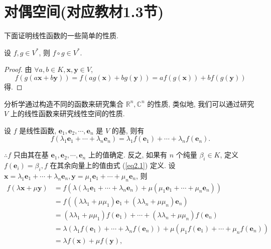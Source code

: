 \documentclass{ctexart}
\begin{document}
\section{对偶空间(对应教材1.3节)}
下面证明线性函数的一些简单的性质.
\begin{property}\label{p2.1}
    设 $f,g\in V^*$, 则 $f\circ g\in V^*$.
\end{property}
\begin{proof}
    由 $\forall a,b\in K,\boldsymbol{x},\boldsymbol{y}\in V$,
    \[f(g(a\boldsymbol{x}+b\boldsymbol{y}))=f(ag(\boldsymbol{x})+bg(\boldsymbol{y}))=af(g(\boldsymbol{x}))+bf(g(\boldsymbol{y}))\]
    得.
\end{proof}

分析学通过构造不同的函数来研究集合 $\mathbb{R}^n,\mathbb{C}^n$ 的性质, 类似地, 我们可以通过研究 $V$ 上的线性函数来研究线性空间的性质.

设 $f$ 是线性函数, $\boldsymbol{e}_1,\boldsymbol{e}_2,\cdots,\boldsymbol{e}_n$ 是 $V$ 的基, 则有
\begin{equation}\label{eq2.1}
    f(\lambda_1\boldsymbol{e}_1+\cdots+\lambda_n\boldsymbol{e}_n)=\lambda_1f(\boldsymbol{e}_1)+\cdots+\lambda_nf(\boldsymbol{e}_n).
\end{equation}

$\therefore f$ 只由其在基 $\boldsymbol{e}_1,\boldsymbol{e}_2,\cdots,\boldsymbol{e}_n$ 上的值确定. 反之, 如果有 $n$ 个纯量 $\beta_i\in K$, 定义 $f(\boldsymbol{e}_i)=\beta_i,f$ 在其余向量上的值由式 (\ref{eq2.1}) 定义. 设 $\boldsymbol{x}=\lambda_1\boldsymbol{e}_1+\cdots+\lambda_n\boldsymbol{e}_n,\boldsymbol{y}=\mu_1\boldsymbol{e}_1+\cdots+\mu_n\boldsymbol{e}_n$, 则
\begin{align*}
    f(\lambda\boldsymbol{x}+\mu\boldsymbol{y}) & =f(\lambda(\lambda_1\boldsymbol{e}_1+\cdots+\lambda_n\boldsymbol{e}_n)+\mu(\mu_1\boldsymbol{e}_1+\cdots+\mu_n\boldsymbol{e}_n)) \\
    & =f((\lambda\lambda_1+\mu\mu_1)\boldsymbol{e}_1+(\lambda\lambda_n+\mu\mu_n)\boldsymbol{e}_n) \\
    & =(\lambda\lambda_1+\mu\mu_1)f(\boldsymbol{e}_1)+\cdots+(\lambda\lambda_n+\mu\mu_n)f(\boldsymbol{e}_n) \\
    & =\lambda(\lambda_1f(\boldsymbol{e}_1)+\cdots+\lambda_nf(\boldsymbol{e}_n))+\mu(\mu_1f(\boldsymbol{e}_1)+\cdots+\mu_nf(\boldsymbol{e}_n)) \\
    & =\lambda f(\boldsymbol{x})+\mu f(\boldsymbol{y}),
\end{align*}
\end{document}
